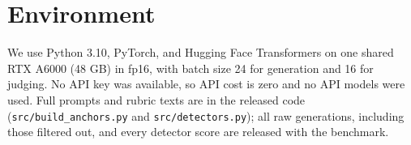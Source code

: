 \section{Environment}
\label{sec:app_env}

We use Python 3.10, PyTorch, and Hugging Face Transformers on one shared RTX A6000 (48 GB) in fp16, with batch size 24 for generation and 16 for judging.
No API key was available, so API cost is zero and no API models were used.
Full prompts and rubric texts are in the released code (\texttt{src/build\_anchors.py} and \texttt{src/detectors.py}); all raw generations, including those filtered out, and every detector score are released with the benchmark.
